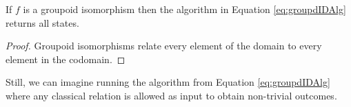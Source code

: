 \begin{theorem}
If $f$ is a groupoid isomorphism then the algorithm in Equation \ref{eq:groupdIDAlg} returns all states.
\end{theorem}
\begin{proof}
Groupoid isomorphisms relate every element of the domain to every element in the codomain.
\end{proof}

Still, we can imagine running the algorithm from Equation \ref{eq:groupdIDAlg} where any classical relation is allowed as input to obtain non-trivial outcomes.
